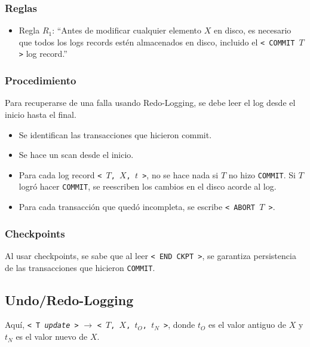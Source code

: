\subsubsection{Reglas}
\begin{itemize}
  \item Regla $R_1$: ``Antes de modificar cualquier elemento $X$ en disco, es necesario que todos los logs records est\'en almacenados en disco, incluido el \texttt{< COMMIT $T$ >} log record.''
\end{itemize}

\subsubsection{Procedimiento}
Para recuperarse de una falla usando Redo-Logging, se debe leer el log desde el inicio hasta el final.
\begin{itemize}
  \item Se identifican las transacciones que hicieron commit.
  \item Se hace un scan desde el inicio.
  \item Para cada log record \texttt{<\ $T$, $X$, $t$ >}, no se hace nada si $T$ no hizo \texttt{COMMIT}. Si $T$ logr\'o hacer \texttt{COMMIT}, se reescriben los cambios en el disco acorde al log.
  \item Para cada transacción que qued\'o incompleta, se escribe \texttt{< ABORT $T$ >}.
\end{itemize}

\subsubsection{Checkpoints}
Al usar checkpoints, se sabe que al leer \texttt{< END CKPT >}, se garantiza persistencia de las transacciones que hicieron \texttt{COMMIT}.


\subsection{Undo/Redo-Logging}
Aquí, \texttt{< T \textit{update} >} $\rightarrow$ \texttt{<\ $T$, $X$, $t_O$, $t_N$ >}, donde $t_O$ es el valor antiguo de $X$ y $t_N$ es el valor nuevo de $X$.

